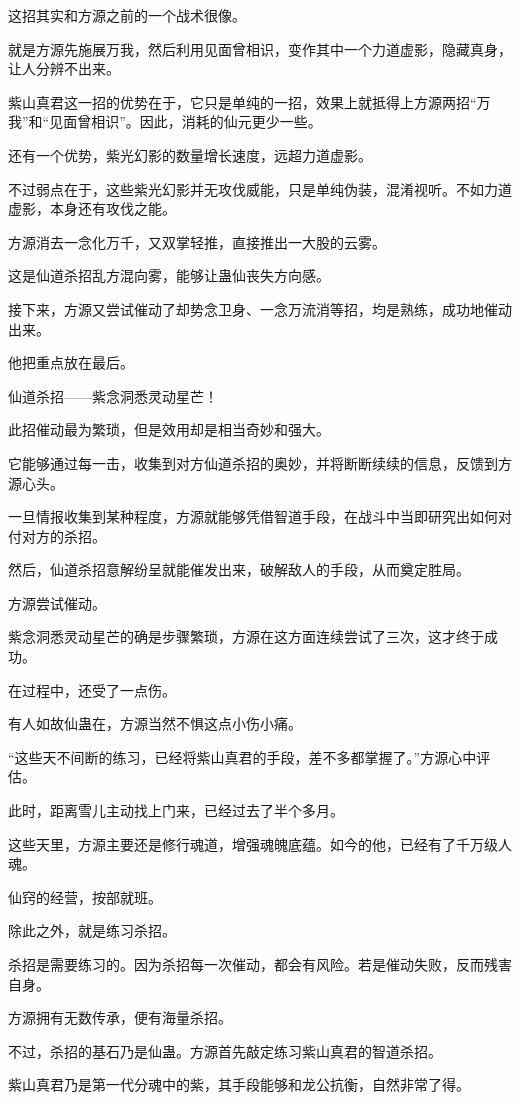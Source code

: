 \begin{this_body}
这招其实和方源之前的一个战术很像。

就是方源先施展万我，然后利用见面曾相识，变作其中一个力道虚影，隐藏真身，让人分辨不出来。

紫山真君这一招的优势在于，它只是单纯的一招，效果上就抵得上方源两招“万我”和“见面曾相识”。因此，消耗的仙元更少一些。

还有一个优势，紫光幻影的数量增长速度，远超力道虚影。

不过弱点在于，这些紫光幻影并无攻伐威能，只是单纯伪装，混淆视听。不如力道虚影，本身还有攻伐之能。

方源消去一念化万千，又双掌轻推，直接推出一大股的云雾。

这是仙道杀招乱方混向雾，能够让蛊仙丧失方向感。

接下来，方源又尝试催动了却势念卫身、一念万流消等招，均是熟练，成功地催动出来。

他把重点放在最后。

仙道杀招——紫念洞悉灵动星芒！

此招催动最为繁琐，但是效用却是相当奇妙和强大。

它能够通过每一击，收集到对方仙道杀招的奥妙，并将断断续续的信息，反馈到方源心头。

一旦情报收集到某种程度，方源就能够凭借智道手段，在战斗中当即研究出如何对付对方的杀招。

然后，仙道杀招意解纷呈就能催发出来，破解敌人的手段，从而奠定胜局。

方源尝试催动。

紫念洞悉灵动星芒的确是步骤繁琐，方源在这方面连续尝试了三次，这才终于成功。

在过程中，还受了一点伤。

有人如故仙蛊在，方源当然不惧这点小伤小痛。

“这些天不间断的练习，已经将紫山真君的手段，差不多都掌握了。”方源心中评估。

此时，距离雪儿主动找上门来，已经过去了半个多月。

这些天里，方源主要还是修行魂道，增强魂魄底蕴。如今的他，已经有了千万级人魂。

仙窍的经营，按部就班。

除此之外，就是练习杀招。

杀招是需要练习的。因为杀招每一次催动，都会有风险。若是催动失败，反而残害自身。

方源拥有无数传承，便有海量杀招。

不过，杀招的基石乃是仙蛊。方源首先敲定练习紫山真君的智道杀招。

紫山真君乃是第一代分魂中的紫，其手段能够和龙公抗衡，自然非常了得。


\end{this_body}
